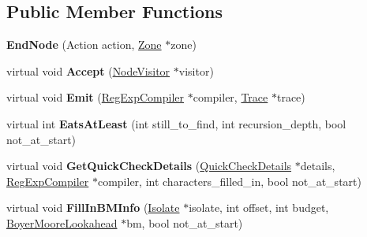 \subsection*{Public Member Functions}
\begin{DoxyCompactItemize}
\item 
{\bfseries End\+Node} (Action action, \hyperlink{classv8_1_1internal_1_1_zone}{Zone} $\ast$zone)\hypertarget{classv8_1_1internal_1_1_end_node_a83274b03e3eb90631e8e6cbe6304bd7b}{}\label{classv8_1_1internal_1_1_end_node_a83274b03e3eb90631e8e6cbe6304bd7b}

\item 
virtual void {\bfseries Accept} (\hyperlink{classv8_1_1internal_1_1_node_visitor}{Node\+Visitor} $\ast$visitor)\hypertarget{classv8_1_1internal_1_1_end_node_aae062820adcd18e8a4a37cc0a6a87fc8}{}\label{classv8_1_1internal_1_1_end_node_aae062820adcd18e8a4a37cc0a6a87fc8}

\item 
virtual void {\bfseries Emit} (\hyperlink{classv8_1_1internal_1_1_reg_exp_compiler}{Reg\+Exp\+Compiler} $\ast$compiler, \hyperlink{classv8_1_1internal_1_1_trace}{Trace} $\ast$trace)\hypertarget{classv8_1_1internal_1_1_end_node_aa9766fcddb47db9257ab45eaf7bdeb6c}{}\label{classv8_1_1internal_1_1_end_node_aa9766fcddb47db9257ab45eaf7bdeb6c}

\item 
virtual int {\bfseries Eats\+At\+Least} (int still\+\_\+to\+\_\+find, int recursion\+\_\+depth, bool not\+\_\+at\+\_\+start)\hypertarget{classv8_1_1internal_1_1_end_node_aa7a860f395270790bc252f5fa2d65598}{}\label{classv8_1_1internal_1_1_end_node_aa7a860f395270790bc252f5fa2d65598}

\item 
virtual void {\bfseries Get\+Quick\+Check\+Details} (\hyperlink{classv8_1_1internal_1_1_quick_check_details}{Quick\+Check\+Details} $\ast$details, \hyperlink{classv8_1_1internal_1_1_reg_exp_compiler}{Reg\+Exp\+Compiler} $\ast$compiler, int characters\+\_\+filled\+\_\+in, bool not\+\_\+at\+\_\+start)\hypertarget{classv8_1_1internal_1_1_end_node_a2d41abdd7fd0c170241068499dba41b9}{}\label{classv8_1_1internal_1_1_end_node_a2d41abdd7fd0c170241068499dba41b9}

\item 
virtual void {\bfseries Fill\+In\+B\+M\+Info} (\hyperlink{classv8_1_1internal_1_1_isolate}{Isolate} $\ast$isolate, int offset, int budget, \hyperlink{classv8_1_1internal_1_1_boyer_moore_lookahead}{Boyer\+Moore\+Lookahead} $\ast$bm, bool not\+\_\+at\+\_\+start)\hypertarget{classv8_1_1internal_1_1_end_node_a524e219bcb14f08d0e15b379731f4f7b}{}\label{classv8_1_1internal_1_1_end_node_a524e219bcb14f08d0e15b379731f4f7b}

\end{DoxyCompactItemize}

